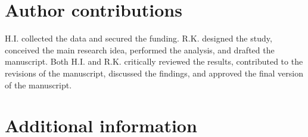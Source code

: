 \documentclass[fleqn,10pt]{wlscirep}
\begin{document}

\section*{Author contributions}
H.I. collected the data and secured the funding. R.K. designed the study, conceived the main research idea, performed the analysis, and drafted the manuscript. Both H.I. and R.K. critically reviewed the results, contributed to the revisions of the manuscript, discussed the findings, and approved the final version of the manuscript.


\section*{Additional information}


\renewcommand{\thefigure}{S\arabic{figure}}
\setcounter{figure}{0}
\end{document}
